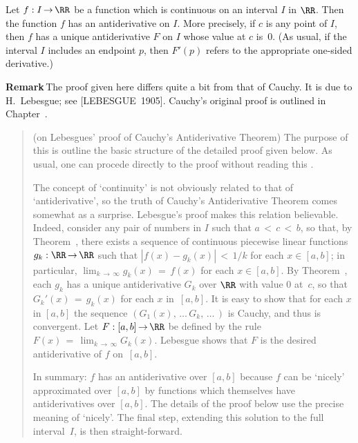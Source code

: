 \V

        Let $f:I \,{\rightarrow}\, {\RR}$ be a function which is continuous on an interval $I$ in ${\RR}$. Then the function $f$ has an antiderivative on $I$.
    More precisely, if $c$ is any point of $I$, then $f$ has a unique antiderivative $F$ on $I$ whose value at $c$ is~$0$.
    (As usual, if the interval $I$ includes an endpoint $p$, then $F'(p)$ refers to the appropriate one-sided derivative.)

\V

        {\bf Remark}\,The proof given here differs quite a bit from that of Cauchy. It is due to H.~Lebesgue; see [LEBESGUE~1905]. Cauchy's original proof is outlined in Chapter~.

\V


\begin{quotation}
{\footnotesize \underline{\Note} (on Lebesgues' proof of Cauchy's Antiderivative Theorem)
        The purpose of this {\Note} is outline the basic structure of the detailed proof given below. As usual, one can procede directly to the proof without reading this {\Note}.

    The concept of `continuity' is not obviously related to that of `antiderivative', so the truth of Cauchy's Antiderivative Theorem comes somewhat as a surprise. Lebesgue's proof makes this relation believable.
    Indeed, consider any pair of numbers in $I$ such that $a\,<\,c\,<\,b$, so that, by Theorem~, there exists a sequence of
    continuous piecewise linear functions $g_{k}:{\RR} \,{\rightarrow}\, {\RR}$ such that $|f(x)-g_{k}(x)|\,<\,1/k$ for each $x{\in}[a,b]$;
    in particular, $\lim_{k \,{\rightarrow}\, {\infty}} g_{k}(x) \,=\, f(x)$ for each $x{\in}[a,b]$. By Theorem~, each $g_{k}$ has a unique antiderivative $G_{k}$ over ${\RR}$ with value $0$ at~$c$, 
    so that $G_{k}'(x) \,=\, g_{k}(x)$ for each $x$ in~$[a,b]$. It is easy to show that for each $x$ in $[a,b]$ the sequence $(G_{1}(x),\,{\ldots}\,G_{k},\,{\ldots}\,)$ is Cauchy, and thus is convergent.
    Let $F:[a,b] \,{\rightarrow}\, {\RR}$ be defined by the rule $F(x) \,=\, \lim_{k \,{\rightarrow}\, {\infty}} G_{k}(x)$. Lebesgue shows that $F$ is the desired antiderivative of $f$ on~$[a,b]$.

    In summary: $f$ has an antiderivative over $[a,b]$ because $f$ can be `nicely' approximated over $[a,b]$ by functions which themselves have antiderivatives over $[a,b]$.
    The details of the proof below use the precise meaning of `nicely'. The final step, extending this solution to the full interval~$I$, is then straight-forward.
}%
\end{quotation}


